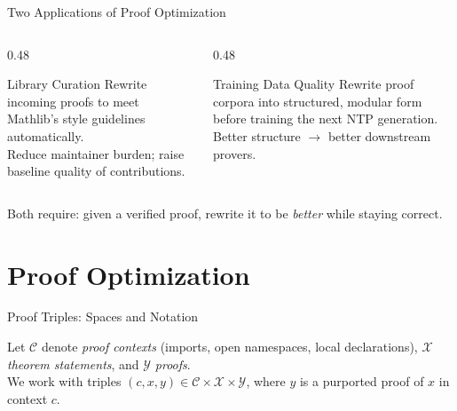 \documentclass{beamer}
\begin{document}
\begin{frame}{Two Applications of Proof Optimization}
\vspace{0.6em}
\begin{columns}[T]
\begin{column}{0.48\textwidth}
\begin{block}{Library Curation}
  Rewrite incoming proofs to meet Mathlib's style guidelines automatically.\\[0.4em]
  Reduce maintainer burden; raise baseline quality of contributions.
\end{block}
\end{column}
\begin{column}{0.48\textwidth}
\begin{block}{Training Data Quality}
  Rewrite proof corpora into structured, modular form before training the next NTP generation.\\[0.4em]
  Better structure $\to$ better downstream provers.
\end{block}
\end{column}
\end{columns}
\vspace{1em}
\begin{exampleblock}{}
  \centering Both require: given a verified proof, rewrite it to be \emph{better} while staying correct.
\end{exampleblock}
\end{frame}

\section{Proof Optimization}

\begin{frame}{Proof Triples: Spaces and Notation}
\vspace{0.4em}
\begin{definition}
Let $\mathcal{C}$ denote \emph{proof contexts} (imports, open namespaces, local declarations), $\mathcal{X}$ \emph{theorem statements}, and $\mathcal{Y}$ \emph{proofs}.\\[0.4em]
We work with triples $(c, x, y) \in \mathcal{C} \times \mathcal{X} \times \mathcal{Y}$, where $y$ is a purported proof of $x$ in context $c$.
\end{definition}
\end{frame}
\end{document}
